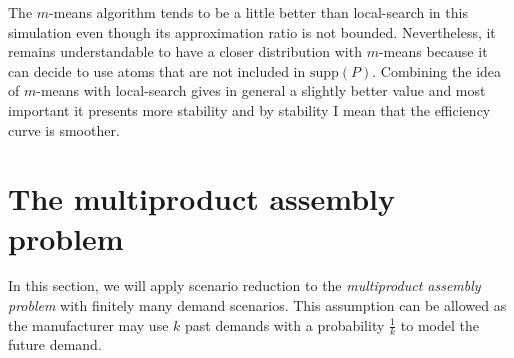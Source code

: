 \documentclass{amsart}
\begin{document}
The $m$-means algorithm tends to be a little better than local-search in this simulation even though its approximation ratio is not bounded. Nevertheless, it remains understandable to have a closer distribution with $m$-means because it can decide to use atoms that are not included in $\text{supp}\left(P\right)$. Combining the idea of $m$-means with local-search gives in general a slightly better value and most important it presents more stability and by stability I mean that the efficiency curve is smoother.

\section{The multiproduct assembly problem}
In this section, we will apply scenario reduction to the \emph{multiproduct assembly problem} with finitely many demand scenarios. This assumption can be allowed as the manufacturer may use $k$ past demands with a probability $\frac{1}{k}$ to model the future demand.
\end{document}

